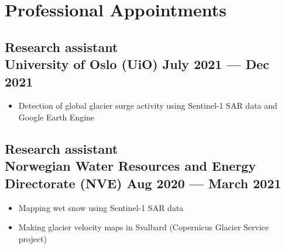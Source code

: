 \documentclass[a4,10pt]{article}
\newenvironment{zitemize}{
\begin{itemize}\itemsep2pt \parskip0pt \parsep1pt}
{\end{itemize}\vspace{-0.5cm}}
\begin{document}
\section{Professional Appointments} %



\subsection*{Research assistant\\University of Oslo (UiO) \hfill July 2021 --- Dec 2021} 
    \begin{zitemize}
        \item Detection of global glacier surge activity using Sentinel-1 SAR data and Google Earth Engine 
    \end{zitemize}


\subsection*{Research assistant \\ Norwegian Water Resources and Energy Directorate (NVE) \hfill Aug 2020 --- March 2021} 
    \begin{zitemize}
        \item Mapping wet snow using Sentinel-1 SAR data
        \item Making glacier velocity maps in Svalbard (Copernicus Glacier Service project)
    \end{zitemize}
\end{document}
